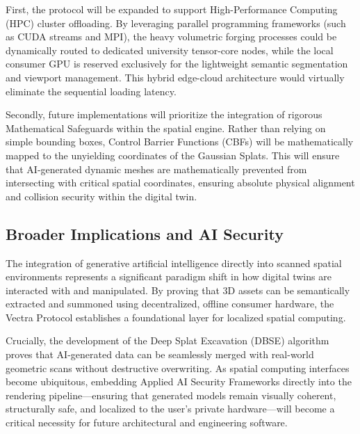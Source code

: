 First, the protocol will be expanded to support High-Performance Computing (HPC) cluster offloading. By leveraging parallel programming frameworks (such as CUDA streams and MPI), the heavy volumetric forging processes could be dynamically routed to dedicated university tensor-core nodes, while the local consumer GPU is reserved exclusively for the lightweight semantic segmentation and viewport management. This hybrid edge-cloud architecture would virtually eliminate the sequential loading latency.

Secondly, future implementations will prioritize the integration of rigorous Mathematical Safeguards within the spatial engine. Rather than relying on simple bounding boxes, Control Barrier Functions (CBFs) will be mathematically mapped to the unyielding coordinates of the Gaussian Splats. This will ensure that AI-generated dynamic meshes are mathematically prevented from intersecting with critical spatial coordinates, ensuring absolute physical alignment and collision security within the digital twin.

\subsection{Broader Implications and AI Security}
The integration of generative artificial intelligence directly into scanned spatial environments represents a significant paradigm shift in how digital twins are interacted with and manipulated. By proving that 3D assets can be semantically extracted and summoned using decentralized, offline consumer hardware, the Vectra Protocol establishes a foundational layer for localized spatial computing. 

Crucially, the development of the Deep Splat Excavation (DBSE) algorithm proves that AI-generated data can be seamlessly merged with real-world geometric scans without destructive overwriting. As spatial computing interfaces become ubiquitous, embedding Applied AI Security Frameworks directly into the rendering pipeline—ensuring that generated models remain visually coherent, structurally safe, and localized to the user's private hardware—will become a critical necessity for future architectural and engineering software.